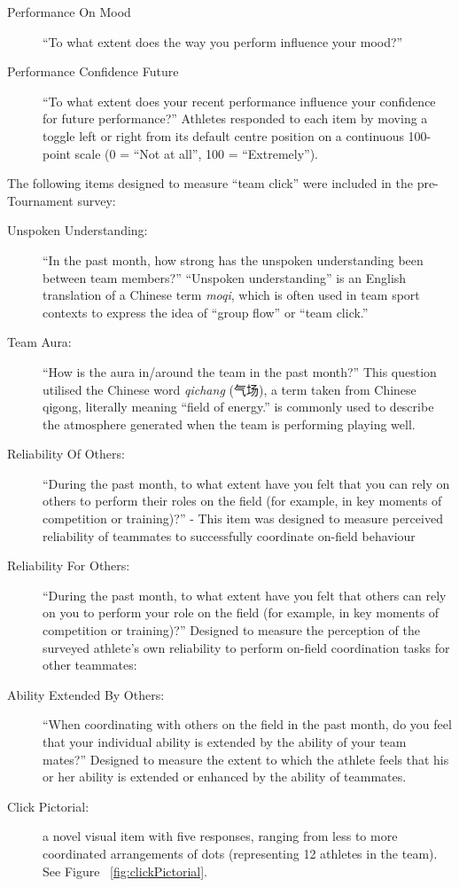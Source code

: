     \begin{description}
    \item[Performance On Mood] ``To what extent does the way you perform influence your mood?''
    \item [Performance Confidence Future] ``To what extent does your recent performance influence your confidence for future performance?''
    Athletes responded to each item by moving a toggle left or right from its default centre position on a continuous 100-point scale (0 = ``Not at all'', 100 = ``Extremely'').
    \end{description}



The following items designed to measure ``team click'' were included in the pre-Tournament survey:
\begin{description}
  \item [Unspoken Understanding:] ``In the past month, how strong has the unspoken understanding been between team members?''  ``Unspoken understanding'' is an English translation of a Chinese term \textit{moqi}, which is often used in team sport contexts to express the idea of  ``group flow'' or ``team click.''
  \item [Team Aura:] ``How is the aura in/around the team in the past month?'' This question utilised the Chinese word \textit{qichang} (气场), a term taken from Chinese qigong, literally meaning ``field of energy.''  is commonly used to describe the atmosphere generated when the team is performing playing well.
  \item [Reliability Of Others:] ``During the past month, to what extent have you felt that you can rely on others to perform their roles on the field (for example, in key moments of competition or training)?'' - This item was designed to measure perceived reliability of teammates to successfully coordinate  on-field behaviour
  \item [Reliability For Others:] ``During the past month, to what extent have you felt that others can rely on you to perform your role on the field (for example, in key moments of competition or training)?'' Designed to measure the perception of the surveyed athlete's own reliability to perform on-field coordination tasks for other teammates:
  \item[Ability Extended By Others:] ``When coordinating with others on the field in the past month, do you feel that your individual ability is extended by the ability of your team mates?'' Designed to measure the extent to which the athlete feels that his or her ability is extended or enhanced by the ability of teammates.
  \item [Click Pictorial:] a novel visual item with five responses, ranging from less to more coordinated arrangements of dots (representing 12 athletes in the team). See Figure ~\ref{fig:clickPictorial}.
\end{description}

